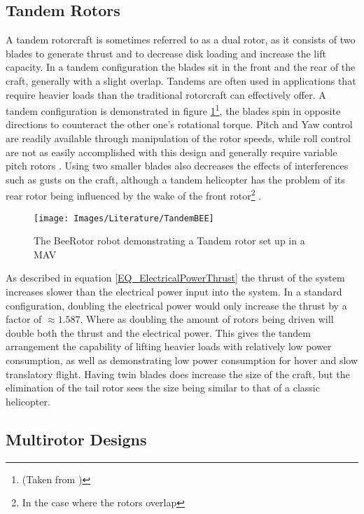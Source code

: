 	\subsection{Tandem Rotors}
	
	A tandem rotorcraft is sometimes referred to as a dual rotor, as it consists of two blades to generate thrust and to decrease disk loading and increase the lift capacity. In a tandem configuration the blades sit in the front and the rear of the craft, generally with a slight overlap. Tandems are often used in applications that require heavier loads than the traditional rotorcraft can effectively offer. A tandem configuration is demonstrated in figure \ref{IM_Tandem}\footnote{(Taken from \cite{Bee})}, the blades spin in opposite directions to counteract the other one's rotational torque. Pitch and Yaw control are readily available through manipulation of the rotor speeds, while roll control are not as easily accomplished with this design and generally require variable pitch rotors \cite{Oh2005}. Using two smaller blades also decreases the effects of interferences such as gusts on the craft, although a tandem helicopter has the problem of its rear rotor being influenced by the wake of the front rotor\footnote{In the case where the rotors overlap} \cite{Camrad1}. 
	
	\begin{figure}[H]
	\centering
	\texttt{[image: Images/Literature/TandemBEE]}     
	\caption{The BeeRotor robot demonstrating a Tandem rotor set up in a MAV \cite{Bee}}
	\label{IM_Tandem}
	\end{figure}
	
	
	As described in equation \eqref{EQ_ElectricalPowerThrust} the thrust of the system increases slower than the electrical power input into the system. In a standard configuration, doubling the electrical power would only increase the thrust by a factor of $\approx 1.587$. Where as doubling the amount of rotors being driven will double both the thrust and the electrical power. This gives the tandem arrangement the capability of lifting heavier loads with relatively low power consumption, as well as demonstrating low power consumption for hover and slow translatory flight. Having twin blades does increase the size of the craft, but the elimination of the tail rotor sees the size being similar to that of a classic helicopter.
	
	
	\subsection{Multirotor Designs}
	
